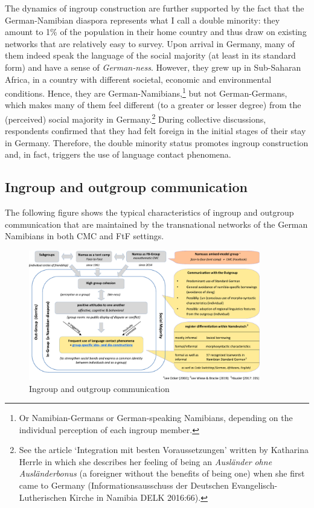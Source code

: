 \documentclass[output=paper]{langsci/langscibook}
\begin{document}
The dynamics of ingroup construction are further supported by the fact that the German-Namibian diaspora represents what I call a double minority: they amount to 1\% of the population in their home country and thus draw on existing networks that are relatively easy to survey. Upon arrival in Germany, many of them indeed speak the language of the social majority (at least in its standard form) and have a sense of \textit{German-ness}. However, they grew up in Sub-Saharan Africa, in a country with different societal, economic and environmental conditions. Hence, they are German-Namibians,\footnote{Or Namibian-Germans or German-speaking Namibians, depending on the individual perception of each ingroup member.}  but not German-Germans, which makes many of them feel different (to a greater or lesser degree) from the (perceived) social majority in Germany.\footnote{See the article ‘Integration mit besten Voraussetzungen’ written by Katharina Herrle in which she describes her feeling of being an \textit{Ausländer} \textit{ohne} \textit{Ausländerbonus} (a foreigner without the benefits of being one) when she first came to Germany (Informationsausschuss der Deutschen Evangelisch-Lutherischen Kirche in Namibia DELK 2016:66).} During collective discussions, respondents confirmed that they had felt foreign in the initial stages of their stay in Germany. Therefore, the double minority status promotes ingroup construction and, in fact, triggers the use of language contact phenomena. 

 
   
\subsection{Ingroup and outgroup communication}
  \label{sec:radke:3.2}
 

The following figure shows the typical characteristics of ingroup and outgroup communication that are maintained by the transnational networks of the German Namibians in both CMC and FtF settings. 

\begin{figure}
 \includegraphics[width=0.9\textwidth]{figures/radkefig2-c.pdf}
\caption{Ingroup and outgroup communication}
\label{fig:radke:2}
\end{figure}  
\end{document}
